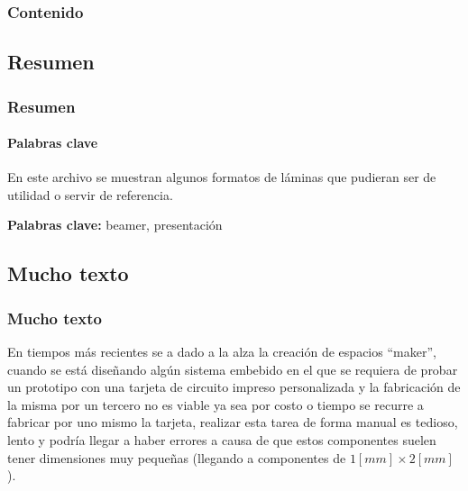 	\begin{frame}
		\thispagestyle{empty} %
		\titlepage %
	\end{frame}
	\begin{frame}
		\frametitle{Contenido} %
		\tableofcontents 
	\end{frame}
	\begin{frame}
		\section{Resumen}
		\frametitle{Resumen} 
		\framesubtitle{Palabras clave}
		\label{Resumen}
		
		En este archivo se muestran algunos formatos de láminas que pudieran ser de utilidad o servir de referencia.
		
		\vspace{5mm}
		
		\label{Keywords}
		\textbf{{\large Palabras clave:}} beamer, presentación
	\end{frame}
	\begin{frame}
		\section{Mucho texto}
		\frametitle{Mucho texto}
		En tiempos más recientes se a dado a la alza la creación de espacios ``maker'', cuando se está diseñando algún sistema embebido en el que se requiera de probar un prototipo con una tarjeta de circuito impreso personalizada y la fabricación de la misma por un tercero no es viable ya sea por costo o tiempo se recurre a fabricar por uno mismo la tarjeta, realizar esta tarea de forma manual es tedioso, lento y podría llegar a haber errores a causa de que estos componentes suelen tener dimensiones muy pequeñas (llegando a componentes de $ 1[mm]\times2[mm] $).
	\end{frame}
